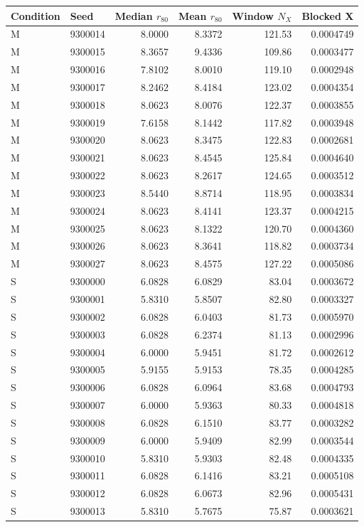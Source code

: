 \begin{longtable}{llrrrr}
\toprule Condition & Seed & Median $r_{80}$ & Mean $r_{80}$ & Window $N_X$ & Blocked X \\
\midrule\endhead
M & 9300014 & 8.0000 & 8.3372 & 121.53 & 0.0004749 \\
M & 9300015 & 8.3657 & 9.4336 & 109.86 & 0.0003477 \\
M & 9300016 & 7.8102 & 8.0010 & 119.10 & 0.0002948 \\
M & 9300017 & 8.2462 & 8.4184 & 123.02 & 0.0004354 \\
M & 9300018 & 8.0623 & 8.0076 & 122.37 & 0.0003855 \\
M & 9300019 & 7.6158 & 8.1442 & 117.82 & 0.0003948 \\
M & 9300020 & 8.0623 & 8.3475 & 122.83 & 0.0002681 \\
M & 9300021 & 8.0623 & 8.4545 & 125.84 & 0.0004640 \\
M & 9300022 & 8.0623 & 8.2617 & 124.65 & 0.0003512 \\
M & 9300023 & 8.5440 & 8.8714 & 118.95 & 0.0003834 \\
M & 9300024 & 8.0623 & 8.4141 & 123.37 & 0.0004215 \\
M & 9300025 & 8.0623 & 8.1322 & 120.70 & 0.0004360 \\
M & 9300026 & 8.0623 & 8.3641 & 118.82 & 0.0003734 \\
M & 9300027 & 8.0623 & 8.4575 & 127.22 & 0.0005086 \\
S & 9300000 & 6.0828 & 6.0829 & 83.04 & 0.0003672 \\
S & 9300001 & 5.8310 & 5.8507 & 82.80 & 0.0003327 \\
S & 9300002 & 6.0828 & 6.0403 & 81.73 & 0.0005970 \\
S & 9300003 & 6.0828 & 6.2374 & 81.13 & 0.0002996 \\
S & 9300004 & 6.0000 & 5.9451 & 81.72 & 0.0002612 \\
S & 9300005 & 5.9155 & 5.9153 & 78.35 & 0.0004285 \\
S & 9300006 & 6.0828 & 6.0964 & 83.68 & 0.0004793 \\
S & 9300007 & 6.0000 & 5.9363 & 80.33 & 0.0004818 \\
S & 9300008 & 6.0828 & 6.1510 & 83.77 & 0.0003282 \\
S & 9300009 & 6.0000 & 5.9409 & 82.99 & 0.0003544 \\
S & 9300010 & 5.8310 & 5.9303 & 82.48 & 0.0004335 \\
S & 9300011 & 6.0828 & 6.1416 & 83.21 & 0.0005108 \\
S & 9300012 & 6.0828 & 6.0673 & 82.96 & 0.0005431 \\
S & 9300013 & 5.8310 & 5.7675 & 75.87 & 0.0003621 \\
\bottomrule\end{longtable}
